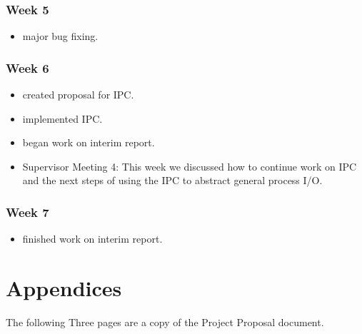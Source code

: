 \documentclass[a4paper]{report}
\begin{document}
\subsection*{Week 5}
\begin{itemize}
\item major bug fixing.
\end{itemize}

\subsection*{Week 6}
\begin{itemize}
\item created proposal for IPC.
\item implemented IPC.
\item began work on interim report.
\item Supervisor Meeting 4: This week we discussed how to continue work on IPC and the next steps of using the IPC to abstract general process I/O.
\end{itemize}

\subsection*{Week 7}
\begin{itemize}
\item finished work on interim report.
\end{itemize}

\chapter*{Appendices}

The following Three pages are a copy of the Project Proposal document.








\end{document}

